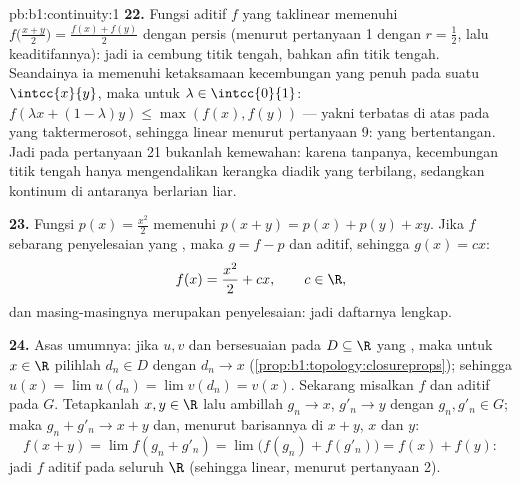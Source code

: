 \begin{solution}{pb:b1:continuity:1}
\textbf{22.} Fungsi aditif $f$ yang taklinear memenuhi
$f\bigl(\frac{x+y}{2}\bigr) = \frac{f(x) + f(y)}{2}$ dengan persis
(menurut pertanyaan 1 dengan $r = \frac12$, lalu keaditifannya): jadi ia
cembung titik tengah, bahkan afin titik tengah. Seandainya ia memenuhi ketaksamaan
kecembungan yang penuh pada suatu  $\intcc{x}{y}$, maka untuk
$\lambda \in \intcc{0}{1}$: $f(\lambda x + (1-\lambda)y) \leq
\max(f(x), f(y))$ --- yakni terbatas di atas pada  yang taktermerosot,
sehingga linear menurut pertanyaan 9: yang bertentangan. Jadi  pada
pertanyaan 21 bukanlah kemewahan: karena tanpanya, kecembungan titik tengah
hanya mengendalikan kerangka diadik yang terbilang, sedangkan kontinum
di antaranya berlarian liar.

\textbf{23.} Fungsi $p(x) = \frac{x^2}{2}$ memenuhi $p(x+y) = p(x) +
p(y) + xy$. Jika $f$ sebarang penyelesaian yang , maka $g = f - p$
 dan aditif, sehingga $g(x) = cx$:
\[
f(x) = \frac{x^2}{2} + cx , \qquad c \in \R ,
\]
dan masing-masingnya merupakan penyelesaian: jadi daftarnya lengkap.

\textbf{24.} Asas umumnya: jika $u, v$  dan
bersesuaian pada $D \subseteq \R$ yang , maka untuk $x \in \R$ pilihlah
$d_n \in D$ dengan $d_n \to x$
(\cref{prop:b1:topology:closureprops}); sehingga $u(x) = \lim u(d_n) =
\lim v(d_n) = v(x)$. Sekarang misalkan $f$  dan aditif pada
  $G$. Tetapkanlah $x, y \in \R$ lalu ambillah $g_n \to x$,
$g'_n \to y$ dengan $g_n, g'_n \in G$; maka $g_n + g'_n \to x + y$
dan, menurut  barisannya di $x + y$, $x$ dan $y$:
\[
f(x + y) = \lim f(g_n + g'_n) = \lim\bigl(f(g_n) +
f(g'_n)\bigr) = f(x) + f(y) :
\]
jadi $f$ aditif pada seluruh $\R$ (sehingga linear, menurut pertanyaan 2).


\end{solution}

